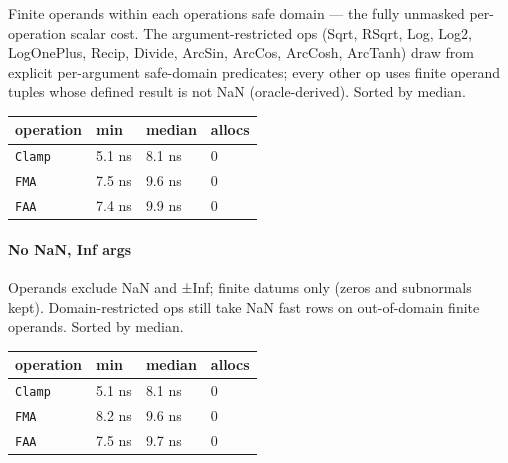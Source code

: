 \label{9973129846987395370}{}


Finite operands within each operation{\textquotesingle}s safe domain — the fully unmasked per-operation scalar cost. The argument-restricted ops (Sqrt, RSqrt, Log, Log2, LogOnePlus, Recip, Divide, ArcSin, ArcCos, ArcCosh, ArcTanh) draw from explicit per-argument safe-domain predicates; every other op uses finite operand tuples whose defined result is not NaN (oracle-derived). Sorted by median.




\begin{table}[h]
\centering
\begin{tabulary}{\linewidth}{L L L L}
\toprule
operation & min & median & allocs \\
\toprule
\texttt{Clamp} & 5.1 ns & 8.1 ns & 0 \\
\texttt{FMA} & 7.5 ns & 9.6 ns & 0 \\
\texttt{FAA} & 7.4 ns & 9.9 ns & 0 \\
\bottomrule
\end{tabulary}

\end{table}



\paragraph{No NaN, Inf args}\indent



\label{15876135725619624151}{}


Operands exclude NaN and ±Inf; finite datums only (zeros and subnormals kept). Domain-restricted ops still take NaN fast rows on out-of-domain finite operands. Sorted by median.




\begin{table}[h]
\centering
\begin{tabulary}{\linewidth}{L L L L}
\toprule
operation & min & median & allocs \\
\toprule
\texttt{Clamp} & 5.1 ns & 8.1 ns & 0 \\
\texttt{FMA} & 8.2 ns & 9.6 ns & 0 \\
\texttt{FAA} & 7.5 ns & 9.7 ns & 0 \\
\bottomrule
\end{tabulary}

\end{table}



